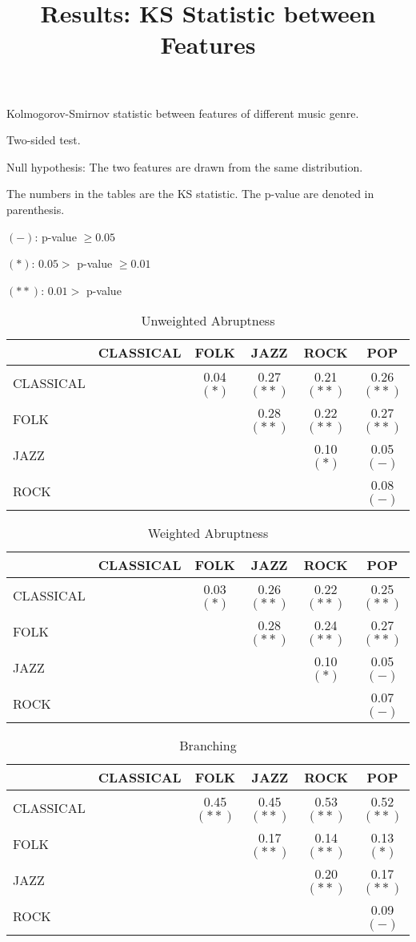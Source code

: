 \documentclass[]{article}
\title{Results: KS Statistic between Features}
\author{}
\newcommand{\pn}{$(-)$}
\newcommand{\pa}{$(\ast)$}
\newcommand{\pb}{$(\ast\ast)$}
\begin{document}
\maketitle

Kolmogorov-Smirnov statistic between features of different music genre.

Two-sided test.

Null hypothesis: The two features are drawn from the same distribution.

The numbers in the tables are the KS statistic. The p-value are denoted in parenthesis.

\pn  : p-value $\ge 0.05$

\pa : $0.05 >$ p-value $\ge 0.01$

\pb: $0.01 >$ p-value

\begin{table}
	\centering
	\caption{Unweighted Abruptness}
	\begin{tabular}{|l | c c c c c|}
		\hline
		& CLASSICAL & FOLK & JAZZ & ROCK & POP \\
		\hline
		CLASSICAL& & 0.04 \pa &0.27 \pb & 0.21 \pb & 0.26 \pb \\
		FOLK & & & 0.28 \pb & 0.22 \pb & 0.27 \pb\\
		JAZZ & &&&0.10 \pa & 0.05 \pn\\
		ROCK & &&& &0.08 \pn\\
		\hline
	\end{tabular}
\end{table}

\begin{table}
	\centering
	\caption{Weighted Abruptness}
	\begin{tabular}{|l | c c c c c|}
		\hline
		& CLASSICAL & FOLK & JAZZ & ROCK & POP \\
		\hline
		CLASSICAL& & 0.03 \pa & 0.26 \pb & 0.22 \pb & 0.25 \pb \\
		FOLK & && 0.28 \pb & 0.24 \pb & 0.27 \pb\\
		JAZZ & &&&0.10 \pa & 0.05 \pn\\
		ROCK & &&&&0.07 \pn\\
		\hline
	\end{tabular}
\end{table}

\begin{table}
	\centering
	\caption{Branching}
	\begin{tabular}{|l | c c c c c|}
		\hline
		& CLASSICAL & FOLK & JAZZ & ROCK & POP \\
		\hline
		CLASSICAL& & 0.45 \pb & 0.45 \pb & 0.53 \pb & 0.52 \pb\\
		FOLK & &&0.17 \pb & 0.14 \pb & 0.13 \pa\\
		JAZZ & &&&0.20 \pb & 0.17 \pb\\
		ROCK & &&&&0.09 \pn\\
		\hline
	\end{tabular}
\end{table}
\end{document}
